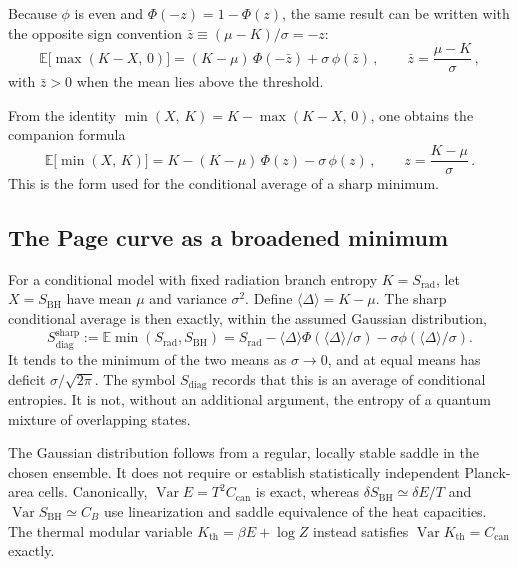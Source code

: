 \documentclass[11pt,letterpaper]{article}
\theoremstyle{plain}
\theoremstyle{definition}
\theoremstyle{remark}
\begin{document}
Because $\phi$ is even and $\Phi(-z) = 1 - \Phi(z)$, the same result can be
written with the opposite sign convention $\bar{z} \equiv (\mu - K)/\sigma
= -z$:
\begin{equation}
  \mathbb{E}\bigl[\max(K - X,\, 0)\bigr]
  = (K - \mu)\,\Phi(-\bar{z}) + \sigma\,\phi(\bar{z})\,,
  \qquad \bar{z} = \frac{\mu - K}{\sigma}\,,
  \label{eq16:gaussian_max_alt}
\end{equation}
with $\bar{z} > 0$ when the mean lies above the threshold.

From the identity $\min(X,\, K) = K - \max(K - X,\, 0)$, one obtains the
companion formula
\begin{equation}
  \mathbb{E}\bigl[\min(X,\, K)\bigr]
  = K - (K - \mu)\,\Phi(z) - \sigma\,\phi(z)\,,
  \qquad z = \frac{K - \mu}{\sigma}\,.
  \label{eq16:gaussian_min}
\end{equation}
This is the form used for the conditional average of a sharp minimum.

\subsection{The Page curve as a broadened minimum}

For a conditional model with fixed radiation branch entropy
$K=S_{\mathrm{rad}}$, let $X=S_{\mathrm{BH}}$ have mean $\mu$ and variance
$\sigma^2$.  Define $\langle\Delta\rangle=K-\mu$.  The sharp conditional
average is then exactly, within the assumed Gaussian distribution,
\begin{equation}
 S_{\mathrm{diag}}^{\mathrm{sharp}}
 :=\mathbb E\min(S_{\mathrm{rad}},S_{\mathrm{BH}})
 =S_{\mathrm{rad}}-\langle\Delta\rangle
 \Phi(\langle\Delta\rangle/\sigma)
 -\sigma\phi(\langle\Delta\rangle/\sigma).
 \label{eq16:page_broadened}
\end{equation}
It tends to the minimum of the two means as $\sigma\to0$, and at equal means
has deficit $\sigma/\sqrt{2\pi}$.  The symbol $S_{\mathrm{diag}}$ records
that this is an average of conditional entropies.  It is not, without an
additional argument, the entropy of a quantum mixture of overlapping states.

The Gaussian distribution follows from a regular, locally stable saddle in
the chosen ensemble.  It does not require or establish statistically
independent Planck-area cells.  Canonically, $\operatorname{Var}E=T^2C_{\mathrm{can}}$
is exact, whereas $\delta S_{\mathrm{BH}}\simeq\delta E/T$ and
$\operatorname{Var}S_{\mathrm{BH}}\simeq C_B$ use linearization and saddle
equivalence of the heat capacities.  The thermal modular variable
$K_{\mathrm{th}}=\beta E+\log Z$ instead satisfies
$\operatorname{Var}K_{\mathrm{th}}=C_{\mathrm{can}}$ exactly.
\end{document}
